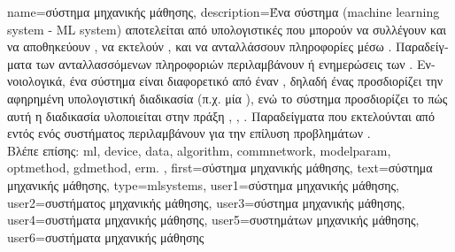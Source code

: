 {name={\foreignlanguage{greek}{σύστημα μηχανικής μάθησης}},
	description={\foreignlanguage{greek}{Ένα σύστημα} 
		(machine learning system - ML system) \foreignlanguage{greek}{αποτελείται από υπολογιστικές} 
		 \foreignlanguage{greek}{που μπορούν να συλλέγουν και να 
		αποθηκεύουν} , \foreignlanguage{greek}{να εκτελούν} 
		, \foreignlanguage{greek}{και να ανταλλάσσουν πληροφορίες 
		μέσω} . \foreignlanguage{greek}{Παραδείγματα των ανταλλασσόμενων πληροφοριών 
		περιλαμβάνουν}  \foreignlanguage{greek}{ή ενημερώσεις 
		των} . 
		\foreignlanguage{greek}{Εννοιολογικά, ένα σύστημα}  \foreignlanguage{greek}{είναι 
		διαφορετικό από έναν}  , \foreignlanguage{greek}{δηλαδή 
		ένας}  \foreignlanguage{greek}{προσδιορίζει την αφηρημένη υπολογιστική 
		διαδικασία (π.χ. μία} ), \foreignlanguage{greek}{ενώ το σύστημα προσδιορίζει 
		το πώς αυτή η διαδικασία υλοποιείται στην πράξη}
		\cite{Sipser2013}, \cite{KnuthAlgoBook}, \cite{tanenbaum2006modern}.
		\foreignlanguage{greek}{Παραδείγματα}  \foreignlanguage{greek}{που 
		εκτελούνται από}  \foreignlanguage{greek}{εντός ενός συστήματος}  
		\foreignlanguage{greek}{περιλαμβάνουν}  \foreignlanguage{greek}{για την επίλυση 
		προβλημάτων} .
		\\
		\foreignlanguage{greek}{Βλέπε επίσης:} \gls{ml}, \gls{device}, \gls{data}, \gls{algorithm}, \gls{commnetwork}, \gls{modelparam}, 
		\gls{optmethod}, \gls{gdmethod}, \gls{erm}. },
 	first={\foreignlanguage{greek}{σύστημα μηχανικής μάθησης}}, 
 	text={\foreignlanguage{greek}{σύστημα μηχανικής μάθησης}},
	type=mlsystems,
	user1={\foreignlanguage{greek}{σύστημα μηχανικής μάθησης}}, %
	user2={\foreignlanguage{greek}{συστήματος μηχανικής μάθησης}}, %
	user3={\foreignlanguage{greek}{σύστημα μηχανικής μάθησης}}, %
	user4={\foreignlanguage{greek}{συστήματα μηχανικής μάθησης}}, %
	user5={\foreignlanguage{greek}{συστημάτων μηχανικής μάθησης}}, %
	user6={\foreignlanguage{greek}{συστήματα μηχανικής μάθησης}} %
}

